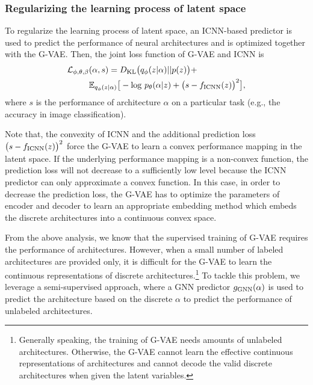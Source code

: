 \documentclass[10pt,twocolumn,letterpaper]{article}
\begin{document}
\subsubsection{Regularizing the learning process of latent space}
To regularize the learning process of latent space, an ICNN-based predictor is used to predict the performance of neural architectures and is optimized together with the G-VAE. Then, the joint loss function of G-VAE and ICNN is 
\begin{align}
	\label{eq:vae_loss_all}
	\mathcal{L}_{\phi, \theta, \beta} & (\alpha,s) =   D_{\rm KL}\big( q_{\phi}(z|\alpha)\vert\vert  p(z) \big) + \nonumber \\ & \mathbb{E}_{q_{\phi}(z|\alpha)} \big[ -{\rm log} \ p_{\theta}(\alpha|z) + \big(s - f_{\rm ICNN}(z)\big)^{2}  \big],
\end{align}
where $s$ is the performance of architecture $\alpha$ on a particular task (e.g., the accuracy in image classification). 

Note that, the convexity of ICNN and the additional prediction loss $\big(s-f_{\rm ICNN}(z)\big)^{2}$ force the G-VAE to learn a convex performance mapping in the latent space. If the underlying performance mapping is a non-convex function, the prediction loss will not decrease to a sufficiently low level because the ICNN predictor can only approximate a convex function. In this case, in order to decrease the prediction loss, the G-VAE has to optimize the parameters of encoder and decoder to learn an appropriate embedding method which embeds the discrete architectures into a continuous convex space. 

From the above analysis, we know that the supervised training of G-VAE requires the performance of architectures. However, when a small number of labeled architectures are provided only, it is difficult for the G-VAE to learn the continuous representations of discrete architectures.\footnote{Generally speaking, the training of G-VAE needs amounts of unlabeled architectures. Otherwise, the G-VAE cannot learn the effective continuous representations of architectures and cannot decode the valid discrete architectures when given the latent variables.} To tackle this problem, we leverage a semi-supervised approach, where a GNN predictor $g_{\rm GNN}(\alpha)$ is used to predict the architecture based on the discrete $\alpha$ to predict the performance of unlabeled architectures. 
\end{document}
